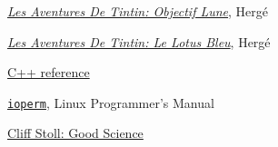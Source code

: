 \documentclass[10pt]{report}
\begin{document}
\begin{thebibliography}{50}

 \hyperlink{https://fr.wikipedia.org/wiki/Objectif_Lune}{\textit{Les Aventures De Tintin: Objectif Lune}}, Hergé

 \hyperlink{https://fr.wikipedia.org/wiki/Le_Lotus_bleu}{\textit{Les Aventures De Tintin: Le Lotus Bleu}}, Hergé

 \hyperlink{http://www.cplusplus.com/reference/}{C++ reference}

 \hyperlink{http://man7.org/linux/man-pages/man2/ioperm.2.html}{\texttt{ioperm}}, Linux Programmer's Manual

 \hyperlink{https://www.youtube.com/watch?v=xHEIOgONq6A}{Cliff Stoll: Good Science}



\end{thebibliography}
\end{document}
